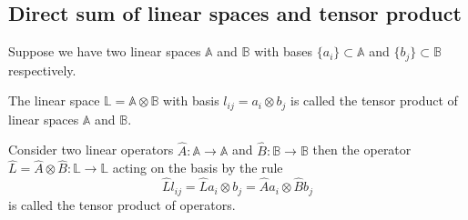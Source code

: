 \subsection{Direct sum of linear spaces and tensor product}

Suppose we have two linear spaces $\mathbb{A}$ and 
$\mathbb{B}$ with bases $\{a_i\} \subset \mathbb{A}$ and
$\{b_j\} \subset \mathbb{B}$ respectively. 

\begin{definition}
The linear space $\mathbb{L} = \mathbb{A} \otimes \mathbb{B}$ with
basis $l_{ij} = a_i \otimes b_j$ is called the tensor product
of linear spaces $\mathbb{A}$ and $\mathbb{B}$. 
\end{definition}

\begin{definition}
\label{def:tensorprod}
Consider two linear operators $\hat{A}: \mathbb{A} \to \mathbb{A}$
and $\hat{B} : \mathbb{B} \to \mathbb{B}$ then the operator 
$\hat{L} = \hat{A} \otimes \hat{B} : \mathbb{L} \to \mathbb{L}$
acting on the basis by the rule
\[
\hat{L} l_{ij} = 
\hat{L} a_i \otimes b_j = 
\hat{A} a_i \otimes \hat{B} b_j
\]
is called the tensor product of operators.
\end{definition}